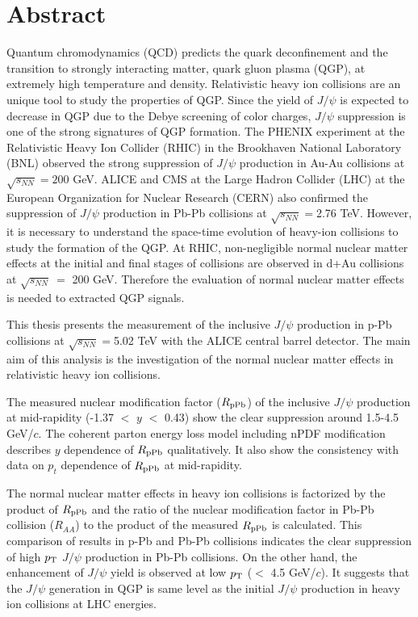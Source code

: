 \chapter*{Abstract}
Quantum chromodynamics (QCD) predicts the quark deconfinement and the transition to strongly interacting matter, quark gluon plasma (QGP), at extremely high temperature and density. 
Relativistic heavy ion collisions are an unique tool to study the properties of QGP. 
Since the yield of $J/\psi$ is expected to decrease in QGP due to the Debye screening of color charges, $J/\psi$ suppression is  one of the strong signatures of QGP formation. 
The PHENIX experiment at the Relativistic Heavy Ion Collider (RHIC) in the Brookhaven National Laboratory (BNL) observed the strong suppression of $J/\psi$ production in Au-Au collisions at $\sqrt{s_{NN}}=200$ GeV. 
ALICE and CMS at the Large Hadron Collider (LHC) at the European Organization for Nuclear Research (CERN) also confirmed the suppression of $J/\psi$ production in Pb-Pb collisions at $\sqrt{s_{NN}}=$2.76 TeV. 
However, it is necessary to understand the space-time evolution of heavy-ion collisions to study the formation of the QGP.  At RHIC, non-negligible normal nuclear matter effects at the initial and final stages of collisions are observed in d+Au collisions at $\sqrt{s_{NN}} ~=$ 200 GeV. 
Therefore the evaluation of normal nuclear matter effects is needed to extracted QGP signals.
 
This thesis presents the measurement of the inclusive $J/\psi$ production in p-Pb collisions at $\sqrt{s_{NN}}=$5.02 TeV with the ALICE central barrel detector.
The main aim of this analysis is the investigation of the normal nuclear matter effects in relativistic heavy ion collisions. 

The measured nuclear modification factor ($R_{\rm{pPb}}$) of the inclusive $J/\psi$ production at mid-rapidity (-1.37 $<$ $y$ $<$ 0.43) show the clear suppression around 1.5-4.5 GeV/$c$. 
The coherent parton energy loss model including nPDF modification describes $y$ dependence of $R_{\rm{pPb}}$ qualitatively. 
It also show the consistency with data on $p_{t}$ dependence of $R_{\rm{pPb}}$ at mid-rapidity. 

The normal nuclear matter effects in heavy ion collisions is factorized by the product of $R_{\rm{pPb}}$ and the ratio of  the nuclear modification factor in Pb-Pb collision ($R_{AA}$) to the product of the measured $R_{\rm{pPb}}$ is calculated.
This comparison of results in p-Pb and Pb-Pb collisions indicates the clear suppression of high $p_{\rm{T}}$  $J/\psi$ production in Pb-Pb collisions. 
On the other hand, the enhancement of $J/\psi$ yield is observed at low $p_{\rm{T}}$ ($<$ 4.5 GeV/$c$). 
It suggests that the $J/\psi$ generation in QGP is same level as the initial $J/\psi$ production in heavy ion collisions at LHC energies. 

